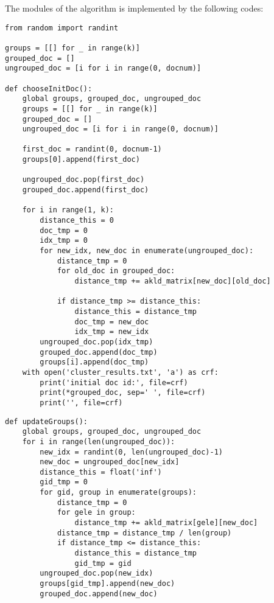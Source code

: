 \documentclass[a4paper, 12pt]{article}
\begin{document}
The modules of the algorithm is implemented by the following codes:

\begin{lstlisting}[style=myPython,caption={Choose initial documents}]
from random import randint

groups = [[] for _ in range(k)]
grouped_doc = []
ungrouped_doc = [i for i in range(0, docnum)]

def chooseInitDoc():
    global groups, grouped_doc, ungrouped_doc
    groups = [[] for _ in range(k)]
    grouped_doc = []
    ungrouped_doc = [i for i in range(0, docnum)]

    first_doc = randint(0, docnum-1)
    groups[0].append(first_doc)

    ungrouped_doc.pop(first_doc)
    grouped_doc.append(first_doc)

    for i in range(1, k):
        distance_this = 0
        doc_tmp = 0
        idx_tmp = 0
        for new_idx, new_doc in enumerate(ungrouped_doc):
            distance_tmp = 0
            for old_doc in grouped_doc:
                distance_tmp += akld_matrix[new_doc][old_doc]

            if distance_tmp >= distance_this:
                distance_this = distance_tmp
                doc_tmp = new_doc
                idx_tmp = new_idx
        ungrouped_doc.pop(idx_tmp)
        grouped_doc.append(doc_tmp)
        groups[i].append(doc_tmp)
    with open('cluster_results.txt', 'a') as crf:
        print('initial doc id:', file=crf)
        print(*grouped_doc, sep=' ', file=crf)
        print('', file=crf)
\end{lstlisting}

\begin{lstlisting}[style=myPython,caption={Update groups}]
def updateGroups():
    global groups, grouped_doc, ungrouped_doc
    for i in range(len(ungrouped_doc)):
        new_idx = randint(0, len(ungrouped_doc)-1)
        new_doc = ungrouped_doc[new_idx]
        distance_this = float('inf')
        gid_tmp = 0
        for gid, group in enumerate(groups):
            distance_tmp = 0
            for gele in group:
                distance_tmp += akld_matrix[gele][new_doc]
            distance_tmp = distance_tmp / len(group)
            if distance_tmp <= distance_this:
                distance_this = distance_tmp
                gid_tmp = gid
        ungrouped_doc.pop(new_idx)
        groups[gid_tmp].append(new_doc)
        grouped_doc.append(new_doc)
\end{lstlisting}
\end{document}
